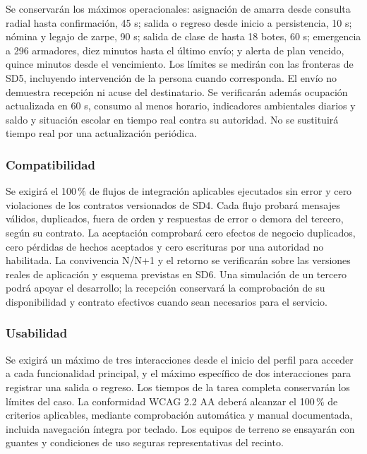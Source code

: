 Se conservarán los máximos operacionales: asignación de amarra desde consulta radial hasta confirmación, 45 s; salida o regreso desde inicio a persistencia, 10 s; nómina y legajo de zarpe, 90 s; salida de clase de hasta 18 botes, 60 s; emergencia a 296 armadores, diez minutos hasta el último envío; y alerta de plan vencido, quince minutos desde el vencimiento. Los límites se medirán con las fronteras de SD5, incluyendo intervención de la persona cuando corresponda. El envío no demuestra recepción ni acuse del destinatario. Se verificarán además ocupación actualizada en 60 s, consumo al menos horario, indicadores ambientales diarios y saldo y situación escolar en tiempo real contra su autoridad. No se sustituirá tiempo real por una actualización periódica. \parencites[cap.~15, RT-09.01 y RT-05.29, p.~35]{sd9-c07}[sec.~5.4, Límites de aceptación del caso]{sd9-sd5}

\subsubsection{Compatibilidad}
Se exigirá el 100\,\% de flujos de integración aplicables ejecutados sin error y cero violaciones de los contratos versionados de SD4. Cada flujo probará mensajes válidos, duplicados, fuera de orden y respuestas de error o demora del tercero, según su contrato. La aceptación comprobará cero efectos de negocio duplicados, cero pérdidas de hechos aceptados y cero escrituras por una autoridad no habilitada. La convivencia N/N+1 y el retorno se verificarán sobre las versiones reales de aplicación y esquema previstas en SD6. Una simulación de un tercero podrá apoyar el desarrollo; la recepción conservará la comprobación de su disponibilidad y contrato efectivos cuando sean necesarios para el servicio. \parencites[20.1, p.~34; RT-10.08, p.~22]{sd9-bt}[sec.~5.2]{sd9-sd5}

\subsubsection{Usabilidad}
Se exigirá un máximo de tres interacciones desde el inicio del perfil para acceder a cada funcionalidad principal, y el máximo específico de dos interacciones para registrar una salida o regreso. Los tiempos de la tarea completa conservarán los límites del caso. La conformidad WCAG 2.2 AA deberá alcanzar el 100\,\% de criterios aplicables, mediante comprobación automática y manual documentada, incluida navegación íntegra por teclado. Los equipos de terreno se ensayarán con guantes y condiciones de uso seguras representativas del recinto. \parencites[RT-13.01--11, p.~26]{sd9-bt}[cap.~15, RT-09.01, p.~35]{sd9-c07}

